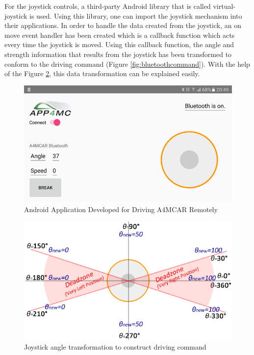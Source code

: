 For the joystick controls, a third-party Android library that is called virtual-joystick \cite{virtualjoystick} is used. Using this library, one can import the joystick mechanism into their applications. In order to handle the data created from the joystick, an on move event handler has been created which is a callback function which acts every time the joystick is moved. Using this callback function, the angle and strength information that results from the joystick has been transformed to conform to the driving command (Figure \ref{fig:bluetoothcommand}). With the help of the Figure \ref{fig:joystickpie}, this data transformation can be explained easily.
\begin{figure}[!ht]
	\centering
	\captionsetup{justification=centering}
	\includegraphics[scale=0.6]{content/images/androidapp.png}
	\caption{Android Application Developed for Driving A4MCAR Remotely}
	\label{fig:androidapp}
\end{figure}
\begin{figure}[!ht]
	\centering
	\captionsetup{justification=centering}
	\includegraphics[scale=0.6]{content/images/joystickpie.png}
	\caption{Joystick angle transformation to construct driving command}
	\label{fig:joystickpie}
\end{figure}

